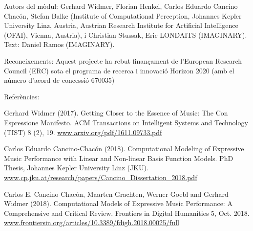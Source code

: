 \vfill

Autors del mòdul: Gerhard Widmer, Florian Henkel, Carlos Eduardo Cancino Chacón, Stefan Balke (Institute of Computational Perception, Johannes Kepler University Linz, Austria, Austrian Research Institute for Artificial Intelligence (OFAI), Vienna, Austria), i Christian Stussak, Eric LONDAITS (IMAGINARY).
Text: Daniel Ramos (IMAGINARY).

Reconeixements: Aquest projecte ha rebut finançament de l'European Research Council (ERC) sota el programa de recerca i innovació Horizon 2020 (amb el número d'acord de concessió 670035)

Referències:

Gerhard Widmer (2017). Getting Closer to the Essence of Music: The Con Espressione Manifesto. ACM Transactions on Intelligent Systems and Technology (TIST) 8 (2), 19. \url{www.arxiv.org/pdf/1611.09733.pdf}

Carlos Eduardo Cancino-Chacón (2018). Computational Modeling of Expressive Music Performance with Linear and Non-linear Basis Function Models. PhD Thesis, Johannes Kepler University Linz (JKU). \url{www.cp.jku.at/research/papers/Cancino_Dissertation_2018.pdf}

Carlos E. Cancino-Chacón, Maarten Grachten, Werner Goebl and Gerhard Widmer (2018). Computational Models of Expressive Music Performance: A Comprehensive and Critical Review. Frontiers in Digital Humanities 5, Oct. 2018. \url{www.frontiersin.org/articles/10.3389/fdigh.2018.00025/full}
